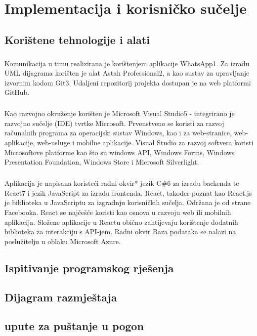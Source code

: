 \chapter{Implementacija i korisničko sučelje}

\section{Korištene tehnologije i alati}

\paragraph{}
{Komunikacija u timu realizirana je korištenjem aplikacije WhatsApp1. Za izradu UML dijagrama korišten je alat Astah Professional2, a kao sustav za upravljanje izvornim kodom Git3. Udaljeni repozitorij projekta dostupan je na web platformi GitHub.
}
\paragraph{}{
Kao razvojno okruženje korišten je Microsoft Visual Studio5 - integrirano je razvojno sučelje (IDE) tvrtke Microsoft. Prvenstveno se koristi za razvoj računalnih programa za operacijski sustav Windows, kao i za web-stranice, web-aplikacije, web-usluge i mobilne aplikacije. Visual Studio za razvoj softvera koristi Microsoftove platforme kao što su windows API, Windows Forms, Windows Presentation Foundation, Windows Store i Microsoft Silverlight.
}
\paragraph{}{
Aplikacija je napisana koristeći radni okvir* jezik C\#6 za izradu backenda te React7 i jezik JavaScript za izradu frontenda. React, također poznat kao React.js je biblioteka u JavaScriptu za izgradnju korisničkih sučelja. Održana je od strane Facebooka. React se najčešće koristi kao osnova u razvoju web ili mobilnih aplikacija. Složene aplikacije u Reactu obično zahtijevaju korištenje dodatnih biblioteka za interakciju s API-jem. Radni okvir Baza podataka se nalazi na poslužitelju u oblaku Microsoft Azure.
}



\section{Ispitivanje programskog rješenja}
\section{Dijagram razmještaja}
\section{upute za puštanje u pogon}


\eject